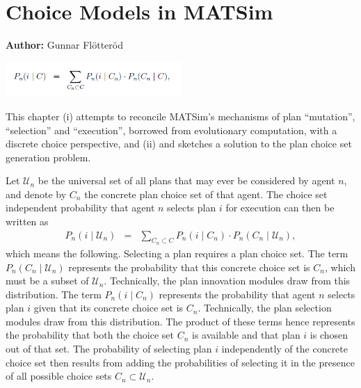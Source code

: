 \chapter{Choice Models in MATSim}
\label{ch:discretechoice}

\hfill \textbf{Author:} Gunnar Flötteröd


\begin{center} \includegraphics[width=0.5\textwidth, angle=0]{understanding/figures/dc.png} \end{center}

This chapter (i) attempts to reconcile MATSim's mechanisms of plan
{}``mutation'', {}``selection'' and {}``execution'', borrowed from evolutionary computation, with a 
discrete choice perspective, and (ii) and sketches a solution to the
plan choice set generation problem.

Let $\mathcal{U}_n$ be the universal set of all plans that may ever be considered
by agent $n$, and denote by $C_{n}$ the concrete plan choice set
of that agent. The choice set independent probability that agent $n$
selects plan $i$ for execution can then be written as
\begin{eqnarray}
P_{n}(i\mid \mathcal{U}_n) & = & \sum_{C_{n}\subset C}P_{n}(i\mid C_{n})\cdot P_{n}(C_{n}\mid \mathcal{U}_n),
\label{eq:unconditional-choice-proba}
\end{eqnarray}
which means the following. Selecting a plan requires a plan choice
set. The term $P_{n}(C_{n}\mid \mathcal{U}_n)$ represents the probability that
this concrete choice set is $C_{n}$, which must be a subset of $\mathcal{U}_n$.
Technically, the plan innovation modules draw from this distribution.
The term $P_{n}(i\mid C_{n})$ represents the probability that agent
$n$ selects plan $i$ given that its concrete choice set is $C_{n}$.
Technically, the plan selection modules draw from this distribution.
The product of these terms hence represents the probability that both
the choice set $C_{n}$ is available and that plan $i$ is chosen out
of that set. The probability of selecting plan $i$ independently
of the concrete choice set then results from adding the probabilities
of selecting it in the presence of all possible choice sets $C_{n}\subset \mathcal{U}_n$.

